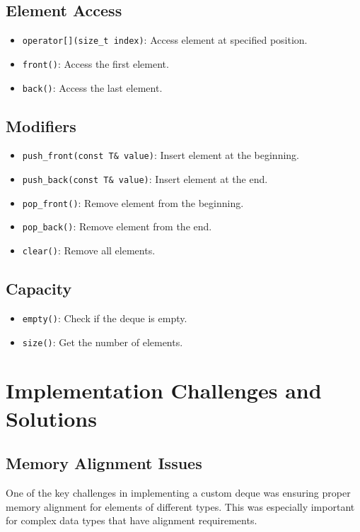 \documentclass[a4paper,12pt]{article}
\begin{document}
\subsection{Element Access}
\begin{itemize}
    \item \texttt{operator[](size\_t index)}: Access element at specified position.
    \item \texttt{front()}: Access the first element.
    \item \texttt{back()}: Access the last element.
\end{itemize}

\subsection{Modifiers}
\begin{itemize}
    \item \texttt{push\_front(const T\& value)}: Insert element at the beginning.
    \item \texttt{push\_back(const T\& value)}: Insert element at the end.
    \item \texttt{pop\_front()}: Remove element from the beginning.
    \item \texttt{pop\_back()}: Remove element from the end.
    \item \texttt{clear()}: Remove all elements.
\end{itemize}

\subsection{Capacity}
\begin{itemize}
    \item \texttt{empty()}: Check if the deque is empty.
    \item \texttt{size()}: Get the number of elements.
\end{itemize}

\section{Implementation Challenges and Solutions}

\subsection{Memory Alignment Issues}
One of the key challenges in implementing a custom deque was ensuring proper memory alignment for elements of different types. This was especially important for complex data types that have alignment requirements.
\end{document}
